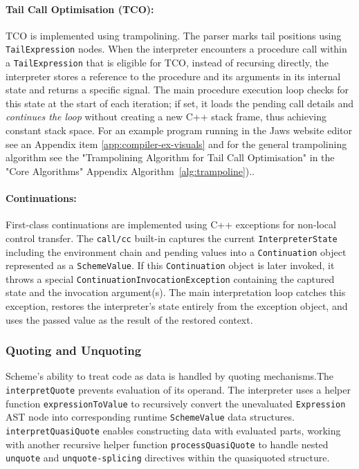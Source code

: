 \documentclass[final]{cmpreport_02}
\begin{document}
\paragraph{Tail Call Optimisation (TCO):}TCO is implemented using trampolining. The parser marks tail positions using \texttt{TailExpression} nodes. When the interpreter encounters a procedure call within a \texttt{TailExpression} that is eligible for TCO, instead of recursing directly, the interpreter stores a reference to the procedure and its arguments in its internal state and returns a specific signal. The main procedure execution loop checks for this state at the start of each iteration; if set, it loads the pending call details and \emph{continues the loop} without creating a new C++ stack frame, thus achieving constant stack space. For an example program running in the Jaws website editor see an Appendix item \ref{app:compiler-ex-visuals} and for the general trampolining algorithm see the "Trampolining Algorithm for Tail Call Optimisation" in the "Core Algorithms" Appendix Algorithm~\ref{alg:trampoline})..

\paragraph{Continuations:}First-class continuations are implemented using C++ exceptions for non-local control transfer. The \texttt{call/cc} built-in captures the current \linebreak\texttt{InterpreterState} including the environment chain and pending values into a \texttt{Continuation} object represented as a \texttt{SchemeValue}. If this \texttt{Continuation} object is later invoked, it throws a special \texttt{ContinuationInvocationException} containing the captured state and the invocation argument(s). The main interpretation loop catches this exception, restores the interpreter's state entirely from the exception object, and uses the passed value as the result of the restored context.

\subsubsection{Quoting and Unquoting}
Scheme's ability to treat code as data is handled by quoting mechanisms.\linebreak The \texttt{interpretQuote} prevents evaluation of its operand. The interpreter uses a helper function \texttt{expressionToValue} to recursively convert the unevaluated \linebreak\texttt{Expression} AST node into corresponding runtime \texttt{SchemeValue} data structures. \texttt{interpretQuasiQuote} enables constructing data with evaluated parts, working with another recursive helper function \texttt{processQuasiQuote} to handle nested \linebreak\texttt{unquote} and \texttt{unquote-splicing} directives within the quasiquoted structure. 
\end{document}
